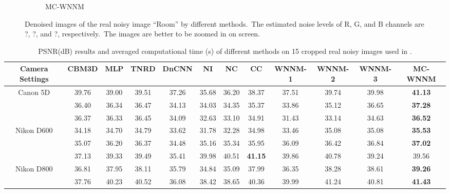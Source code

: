 \begin{figure}
\begin{subfigure}[t]{0.19\textwidth}
		\caption{MC-WNNM}
    \end{subfigure}
    \caption{Denoised images of the real noisy image ``Room'' \cite{ncwebsite} by different methods.\ The estimated noise levels of R, G, and B channels are ?, ?, and ?, respectively.\ The images are better to be zoomed in on screen.}
    \label{fig4-13}
\end{figure}




\begin{table}
\begin{adjustwidth}{-2cm}{}
\caption{PSNR(dB) results and averaged computational time (s) of different methods on 15 cropped real noisy images used in \cite{crosschannel2016}.}
\label{tab4-4}
\label{tabb}
\begin{center}
\renewcommand\arraystretch{1}
\scriptsize
\begin{tabular}{|c||c|c|c|c|c|c|c|c|c|c|c|}
\hline
Camera Settings  
&
\textbf{CBM3D}
&
\textbf{MLP}
&
\textbf{TNRD}
&
\textbf{DnCNN}
&
\textbf{NI}
&
\textbf{NC}
&
\textbf{CC}
&
\textbf{WNNM-1}
&
\textbf{WNNM-2}
&
\textbf{WNNM-3}
&
\textbf{MC-WNNM} 
\\
\hline
\multirow{3}{*}{\small{Canon 5D}} %
& 39.76 & 39.00 & 39.51 & 37.26 & 35.68 & 36.20 & 38.37 & 37.51 & 39.74 & 39.98 & \textbf{41.13}
\\ 
\cline{2-12} 
\multirow{3}{*}{ISO = 3200}   
& 36.40 & 36.34 & 36.47 & 34.13 & 34.03 & 34.35 & 35.37 & 33.86 & 35.12 & 36.65 & \textbf{37.28}
\\ 
\cline{2-12}    
& 36.37 & 36.33 & 36.45 & 34.09 & 32.63 & 33.10 & 34.91 & 31.43 & 33.14 & 34.63 & \textbf{36.52}  
\\
\hline
\multirow{3}{*}{Nikon D600} 
& 34.18 & 34.70 & 34.79 & 33.62 & 31.78 & 32.28 & 34.98 & 33.46 & 35.08 & 35.08 & \textbf{35.53}
\\ 
\cline{2-12} 
\multirow{3}{*}{ISO = 3200}   
& 35.07 & 36.20 & 36.37 & 34.48 & 35.16 & 35.34 & 35.95 & 36.09 & 36.42 & 36.84 & \textbf{37.02}
\\ 
\cline{2-12}    
& 37.13 & 39.33 & 39.49 & 35.41 & 39.98 & 40.51 & \textbf{41.15} & 39.86 & 40.78 & 39.24 & 39.56
\\
\hline
\multirow{3}{*}{Nikon D800} 
& 36.81  & 37.95 & 38.11 & 35.79 & 34.84 & 35.09 & 37.99 & 36.35 & 38.28 & 38.61 & \textbf{39.26}
\\ 
\cline{2-12} 
\multirow{3}{*}{ISO = 1600}   
& 37.76 & 40.23 & 40.52 & 36.08 & 38.42 & 38.65 & 40.36 & 39.99 & 41.24 & 40.81 & \textbf{41.43}
\\ 

\end{tabular}
\end{center}
\end{adjustwidth}
\end{table}
